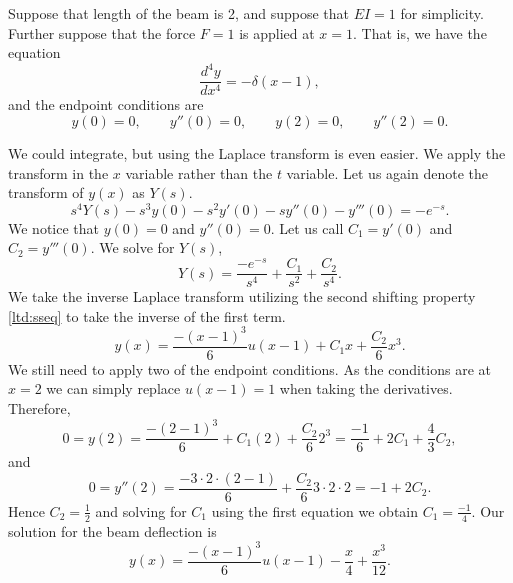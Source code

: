 \begin{example} \label{lt:examplebeam}
Suppose that length of the beam is 2, and suppose that $EI=1$ for
simplicity.  Further suppose that the force $F=1$ is applied at $x=1$.
That is, we have the equation
\begin{equation*}
\frac{d^4 y}{dx^4} = -\delta(x-1) ,
\end{equation*}
and the endpoint conditions are
\begin{equation*}
y(0) = 0, \qquad y''(0) = 0, \qquad
y(2) = 0, \qquad y''(2) = 0.
\end{equation*}

We could integrate, but using the Laplace transform
is even easier.
We apply the transform
in the $x$ variable rather than the $t$ variable.  Let us again denote the
transform of $y(x)$ as $Y(s)$.
\begin{equation*}
s^4Y(s)-s^3y(0)-s^2y'(0)-sy''(0)-y'''(0)
= -e^{-s}.
\end{equation*}
We notice that $y(0) = 0$ and $y''(0) = 0$.  Let us
call $C_1 = y'(0)$ and $C_2=y'''(0)$.
We solve for $Y(s)$,
\begin{equation*}
Y(s) = \frac{-e^{-s}}{s^4} + \frac{C_1}{s^2}+ \frac{C_2}{s^4} .
\end{equation*}
We take the inverse Laplace transform utilizing the 
second shifting property \eqref{ltd:sseq} to take the inverse of the first
term.
\begin{equation*}
y(x) = \frac{-{(x-1)}^3}{6} u(x-1) + C_1 x + \frac{C_2}{6} x^3 .
\end{equation*}
We still need to apply two of the endpoint conditions.  As the conditions
are at $x=2$ we can simply replace $u(x-1) = 1$ when taking
the derivatives.  Therefore,
\begin{equation*}
0 = y(2) = \frac{-{(2-1)}^3}{6} + C_1 (2) + \frac{C_2}{6} 2^3 =
\frac{-1}{6} + 2 C_1 + \frac{4}{3} C_2 ,
\end{equation*}
and
\begin{equation*}
0 = y''(2) = \frac{-3\cdot 2 \cdot (2-1)}{6} + \frac{C_2}{6} 3\cdot 2 \cdot 2
 = -1 + 2 C_2 .
\end{equation*}
Hence $C_2 = \frac{1}{2}$ and solving for $C_1$ using the first
equation we obtain
$C_1 = \frac{-1}{4}$.  Our solution for the beam deflection is
\begin{equation*}
y(x) = \frac{-{(x-1)}^3}{6} u(x-1) - \frac{x}{4} + \frac{x^3}{12} .
\end{equation*}
\end{example}

